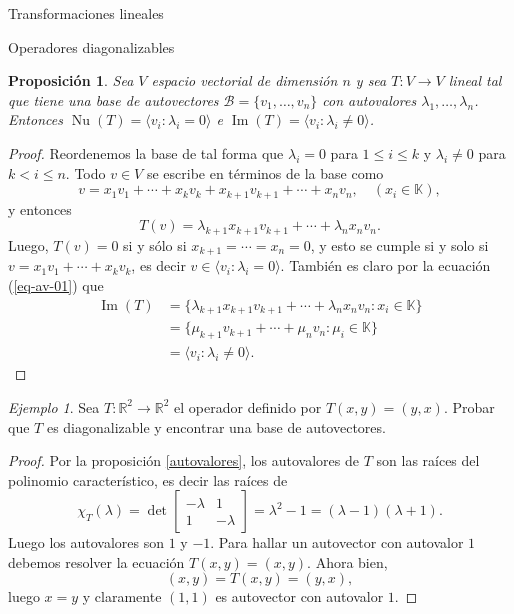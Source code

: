 \documentclass[a4paper,12pt,twoside,spanish,reqno]{amsbook}
\numberwithin{equation}{section}
\newtheorem{proposicion}[teorema]{Proposici\'on}
\theoremstyle{definition}
\theoremstyle{remark}
\newtheorem*{ejemplo*}{Ejemplo}
\newcommand{\img}{\operatorname{Im}}
\newcommand{\nuc}{\operatorname{Nu}}
\newcommand{\R}{\mathbb R}
\newcommand{\K}{\mathbb K}
\begin{document}
\begin{chapter}{Transformaciones lineales}
\begin{section}{Operadores diagonalizables}
        \begin{proposicion} Sea $V$ espacio vectorial de dimensión $n$ y sea $T: V \to V$ lineal tal que tiene una base de autovectores $\mathcal{B} = \{v_1,\ldots,v_n \}$  con autovalores $\lambda_1,\ldots,\lambda_n$. Entonces $\nuc(T)=\langle v_i: \lambda_i =0 \rangle$ e  $\img(T)=\langle v_i: \lambda_i \not=0 \rangle$.			
        \end{proposicion}
        \begin{proof} Reordenemos la base de tal forma que  $\lambda_i =0$ para $1 \le i \le k$ y $\lambda_i \ne 0$ para $k < i \le n$. 
        Todo $v \in V$ se escribe en términos de la base como 
        $$
        v = x_1v_1 + \cdots+ x_k v_k+ x_{k+1} v_{k+1}+\cdots+ x_n v_n,\quad (x_i \in \K),
        $$
        y entonces
        \begin{equation}\label{eq-av-01}
            T(v) =  \lambda_{k+1}x_{k+1} v_{k+1}+\cdots+ \lambda_nx_n v_n.
        \end{equation}
        Luego, $T(v) =0$ si y sólo si $x_{k+1} = \cdots = x_n=0$, y esto se cumple si y solo si $v =  x_1v_1 + \cdots+ x_k v_k$,  es decir $v \in \langle v_i: \lambda_i =0 \rangle$. 
        También es claro por la ecuación (\ref{eq-av-01}) que 
        \begin{align*}
            \img(T) &= \{\lambda_{k+1}x_{k+1} v_{k+1}+\cdots+ \lambda_nx_n v_n: x_i \in \K \} \\
            &=\{\mu_{k+1} v_{k+1}+\cdots+ \mu_n v_n: \mu_i \in \K \}\\
            &= \langle v_i: \lambda_i \not=0 \rangle.
        \end{align*}
        \end{proof}
        
        \begin{ejemplo*}
            Sea $T:\R^2 \longrightarrow \R^2$ el operador definido por $T(x,y)=(y,x)$. Probar que $T$ es diagonalizable y encontrar una base de autovectores. 
        \end{ejemplo*}
        \begin{proof}
            Por la proposición \ref{autovalores}, los autovalores de $T$  son las raíces del polinomio característico,  es decir las raíces de 
            $$
            \chi_T(\lambda)= \det\left[\begin{matrix}
            -\lambda& 1 \\ 1 & -\lambda
            \end{matrix} \right]= \lambda^2 -1  =(\lambda -1)(\lambda +1). 
            $$
            Luego los autovalores son $1$ y $-1$. Para hallar un autovector con autovalor $1$ debemos resolver la ecuación $T(x,y) = (x,y)$. Ahora bien, 
            $$
            (x,y) = T(x,y) = (y,x),
            $$
            luego $x =y$ y claramente $(1,1)$ es autovector con autovalor $1$.
            

\end{proof}
\end{section}
\end{chapter}
\end{document}

